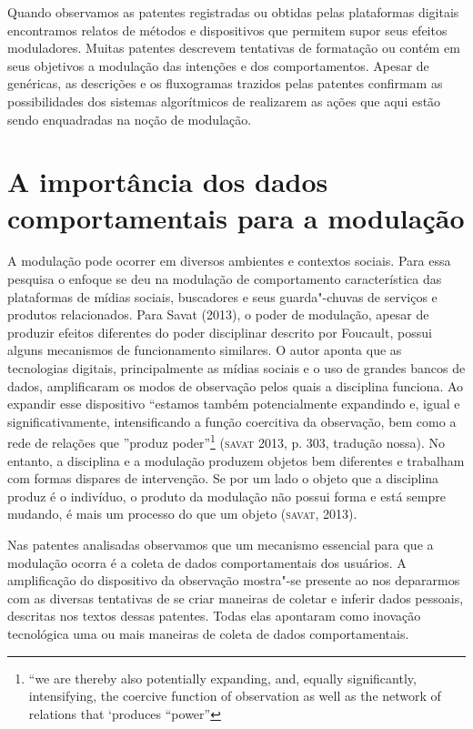 Quando observamos as patentes registradas ou obtidas pelas plataformas
digitais encontramos relatos de métodos e dispositivos que permitem
supor seus efeitos moduladores. Muitas patentes descrevem tentativas de
formatação ou contém em seus objetivos a modulação das intenções e dos
comportamentos. Apesar de genéricas, as descrições e os fluxogramas
trazidos pelas patentes confirmam as possibilidades dos sistemas
algorítmicos de realizarem as ações que aqui estão sendo enquadradas na
noção de modulação.

\section{A importância dos dados comportamentais para a modulação}

\noindent{}A modulação pode ocorrer em diversos ambientes e contextos sociais. Para
essa pesquisa o enfoque se deu na modulação de comportamento
característica das plataformas de mídias sociais, buscadores e seus
guarda"-chuvas de serviços e produtos relacionados. Para Savat (2013), o
poder de modulação, apesar de produzir efeitos diferentes do poder
disciplinar descrito por Foucault, possui alguns mecanismos de
funcionamento similares. O autor aponta que as tecnologias digitais,
principalmente as mídias sociais e o uso de grandes bancos de dados,
amplificaram os modos de observação pelos quais a disciplina funciona.
Ao expandir esse dispositivo ``estamos também potencialmente expandindo
e, igual e significativamente, intensificando a função coercitiva da
observação, bem como a rede de relações que ''produz poder''\footnote{``we
  are thereby also potentially expanding, and, equally significantly,
  intensifying, the coercive function of observation as well as the
  network of relations that `produces ``power''} (\textsc{savat} 2013, p. 303,
tradução nossa). No entanto, a disciplina e a modulação produzem objetos
bem diferentes e trabalham com formas dispares de intervenção. Se por um
lado o objeto que a disciplina produz é o indivíduo, o produto da
modulação não possui forma e está sempre mudando, é mais um processo do
que um objeto (\textsc{savat}, 2013).

Nas patentes analisadas observamos que um mecanismo essencial para que a
modulação ocorra é a coleta de dados comportamentais dos usuários. A
amplificação do dispositivo da observação mostra"-se presente ao nos
depararmos com as diversas tentativas de se criar maneiras de coletar e
inferir dados pessoais, descritas nos textos dessas patentes. Todas elas
apontaram como inovação tecnológica uma ou mais maneiras de coleta de
dados comportamentais.

